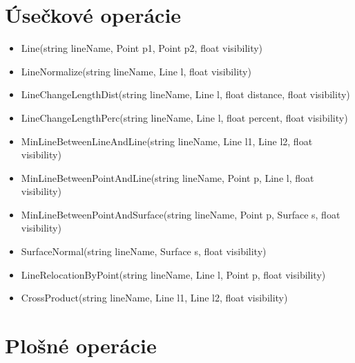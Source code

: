\section{Úsečkové operácie}
		
\begin{itemize}
		\item Line(string lineName, Point p1, Point p2, float visibility) 

		\item LineNormalize(string lineName, Line l, float visibility)

		\item LineChangeLengthDist(string lineName, Line l, float distance, float visibility)
		
		\item LineChangeLengthPerc(string lineName, Line l, float percent, float visibility) 



		
		\item MinLineBetweenLineAndLine(string lineName, Line l1, Line l2, float visibility)
		
		\item MinLineBetweenPointAndLine(string lineName, Point p, Line l, float visibility)
		
		\item MinLineBetweenPointAndSurface(string lineName, Point p, Surface s, float visibility)


		\item SurfaceNormal(string lineName, Surface s, float visibility) 



		\item LineRelocationByPoint(string lineName, Line l, Point p, float visibility)


		\item CrossProduct(string lineName, Line l1, Line l2, float visibility)

\end{itemize}

\section{Plošné operácie}

